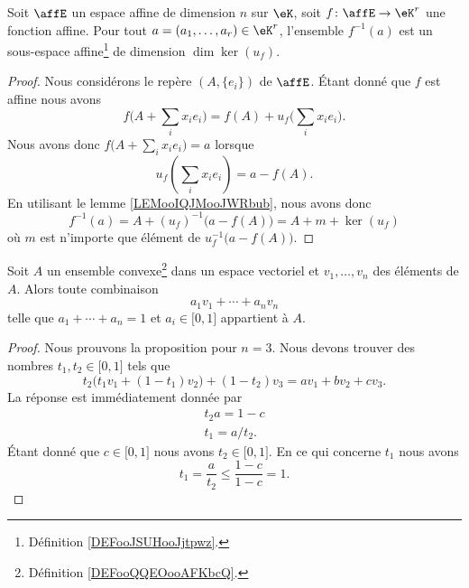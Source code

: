 \begin{proposition}     \label{PROPooAKJBooMkmsiV}
	Soit \( \affE\) un espace affine de dimension \( n\) sur \( \eK\), soit \( f\colon \affE\to \eK^r\) une fonction affine. Pour tout \( a=(a_1,\ldots, a_r)\in \eK^r\), l'ensemble \( f^{-1}(a)\) est un sous-espace affine\footnote{Définition \ref{DEFooJSUHooJjtpwz}.} de dimension \( \dim\ker(u_f)\).
\end{proposition}

\begin{proof}
	Nous considérons le repère \( (A,\{ e_i \})\) de \( \affE\). Étant donné que \( f\) est affine nous avons
	\begin{equation}
		f\big( A+\sum_ix_ie_i \big)=f(A)+u_f\big( \sum_ix_ie_i \big).
	\end{equation}
	Nous avons donc \( f\big( A+\sum_ix_ie_i \big)=a\) lorsque
	\begin{equation}
		u_f(\sum_ix_ie_i)=a-f(A).
	\end{equation}
	En utilisant le lemme \ref{LEMooIQJMooJWRbub}, nous avons donc
	\begin{equation}
		f^{-1}(a)=A+(u_f)^{-1}\big( a-f(A) \big)=A+m+\ker(u_f)
	\end{equation}
	où \( m\) est n'importe que élément de \( u_f^{-1}\big(a-f(A)\big)\).
\end{proof}

\begin{proposition}     \label{PropPoNpPz}
	Soit \( A\) un ensemble convexe\footnote{Définition \ref{DEFooQQEOooAFKbcQ}.} dans un espace vectoriel et \( v_1,\ldots, v_n\) des éléments de \( A\). Alors toute combinaison
	\begin{equation}
		a_1v_1+\cdots +a_nv_n
	\end{equation}
	telle que \( a_1+\cdots +a_n=1\) et \( a_i\in\mathopen[ 0 , 1 \mathclose]\) appartient à \( A\).
\end{proposition}

\begin{proof}
	Nous prouvons la proposition pour \( n=3\). Nous devons trouver des nombres \( t_1,t_2\in \mathopen[ 0 , 1 \mathclose]\) tels que
	\begin{equation}
		t_2\big( t_1v_1+(1-t_1)v_2 \big)+(1-t_2)v_3=av_1+bv_2+cv_3.
	\end{equation}
	La réponse est immédiatement donnée par
	\begin{subequations}
		\begin{align}
			t_2a=1-c \\
			t_1=a/t_2.
		\end{align}
	\end{subequations}
	Étant donné que \( c\in \mathopen[ 0 , 1 \mathclose]\) nous avons \( t_2\in\mathopen[ 0 , 1 \mathclose]\). En ce qui concerne \( t_1\) nous avons
	\begin{equation}
		t_1=\frac{ a }{ t_2 }\leq \frac{ 1-c }{ 1-c }=1.
	\end{equation}
\end{proof}


